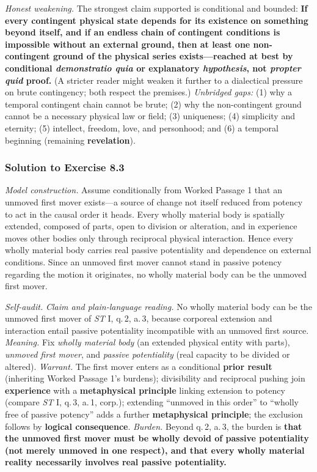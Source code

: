 \emph{Honest weakening.} The strongest claim supported is conditional and bounded: \textbf{If every contingent physical state depends for its existence on something beyond itself, and if an endless chain of contingent conditions is impossible without an external ground, then at least one non-contingent ground of the physical series exists---reached at best by conditional \emph{demonstratio quia} or explanatory \emph{hypothesis}, not \emph{propter quid} proof.} (A stricter reader might weaken it further to a dialectical pressure on brute contingency; both respect the premises.) \emph{Unbridged gaps:} (1) why a temporal contingent chain cannot be brute; (2) why the non-contingent ground cannot be a necessary physical law or field; (3) uniqueness; (4) simplicity and eternity; (5) intellect, freedom, love, and personhood; and (6) a temporal beginning (remaining \textbf{revelation}).

\subsubsection*{Solution to Exercise 8.3}
\emph{Model construction.} Assume conditionally from Worked Passage 1 that an unmoved first mover exists---a source of change not itself reduced from potency to act in the causal order it heads. Every wholly material body is spatially extended, composed of parts, open to division or alteration, and in experience moves other bodies only through reciprocal physical interaction. Hence every wholly material body carries real passive potentiality and dependence on external conditions. Since an unmoved first mover cannot stand in passive potency regarding the motion it originates, no wholly material body can be the unmoved first mover.

\emph{Self-audit.} \emph{Claim and plain-language reading.} No wholly material body can be the unmoved first mover of \emph{ST} I, q.\,2, a.\,3, because corporeal extension and interaction entail passive potentiality incompatible with an unmoved first source. \emph{Meaning.} Fix \emph{wholly material body} (an extended physical entity with parts), \emph{unmoved first mover}, and \emph{passive potentiality} (real capacity to be divided or altered). \emph{Warrant.} The first mover enters as a conditional \textbf{prior result} (inheriting Worked Passage 1's burdens); divisibility and reciprocal pushing join \textbf{experience} with a \textbf{metaphysical principle} linking extension to potency (compare \emph{ST} I, q.\,3, a.\,1, corp.); extending ``unmoved in this order'' to ``wholly free of passive potency'' adds a further \textbf{metaphysical principle}; the exclusion follows by \textbf{logical consequence}. \emph{Burden.} Beyond q.\,2, a.\,3, the burden is \textbf{that the unmoved first mover must be wholly devoid of passive potentiality (not merely unmoved in one respect), and that every wholly material reality necessarily involves real passive potentiality.}

